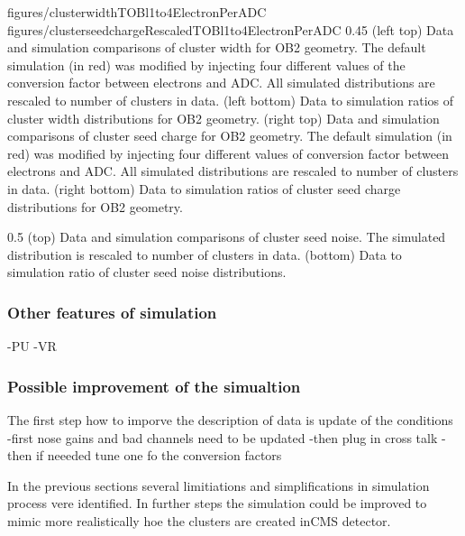                  {figures/clusterwidthTOBl1to4ElectronPerADC}
                 {figures/clusterseedchargeRescaledTOBl1to4ElectronPerADC} %
                 {0.45}       %
                 {(left top) Data and simulation  comparisons of cluster width for OB2 geometry. The default simulation (in red) was modified by injecting four different values of the conversion factor between electrons and ADC. All simulated distributions are rescaled to number of clusters in data. (left bottom) Data to simulation ratios of cluster width distributions for OB2 geometry. (right top) Data and simulation  comparisons of cluster seed charge for OB2 geometry. The default simulation (in red) was modified by injecting four different values of conversion factor between electrons and ADC. All simulated distributions are rescaled to number of clusters in data. (right bottom) Data to simulation ratios of cluster seed charge distributions for OB2 geometry. }

                 {0.5}       %
                 { (top) Data and simulation comparisons of cluster seed noise. The simulated distribution is rescaled to number of clusters in data. (bottom) Data to simulation ratio of cluster seed noise distributions. }

 
\subsubsection{Other features of simulation}
-PU
-VR

\subsubsection{Possible improvement of the simualtion}

The first step how to imporve the description of data is update of the conditions
-first nose gains and bad channels need to be updated
-then plug in cross talk
- then if neeeded tune one fo the conversion factors

In the previous sections several limitiations and simplifications in simulation process vere identified. In further steps the simulation could be improved to mimic more realistically hoe the clusters are created inCMS detector.


